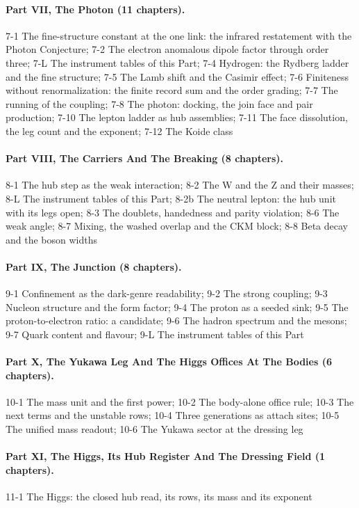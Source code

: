 \paragraph{Part VII, The Photon (11 chapters).} 7-1 The fine-structure constant at the one link: the infrared restatement with the Photon Conjecture; 7-2 The electron anomalous dipole factor through order three; 7-L The instrument tables of this Part; 7-4 Hydrogen: the Rydberg ladder and the fine structure; 7-5 The Lamb shift and the Casimir effect; 7-6 Finiteness without renormalization: the finite record sum and the order grading; 7-7 The running of the coupling; 7-8 The photon: docking, the join face and pair production; 7-10 The lepton ladder as hub assemblies; 7-11 The face dissolution, the leg count and the exponent; 7-12 The Koide class
\paragraph{Part VIII, The Carriers And The Breaking (8 chapters).} 8-1 The hub step as the weak interaction; 8-2 The W and the Z and their masses; 8-L The instrument tables of this Part; 8-2b The neutral lepton: the hub unit with its legs open; 8-3 The doublets, handedness and parity violation; 8-6 The weak angle; 8-7 Mixing, the washed overlap and the CKM block; 8-8 Beta decay and the boson widths
\paragraph{Part IX, The Junction (8 chapters).} 9-1 Confinement as the dark-genre readability; 9-2 The strong coupling; 9-3 Nucleon structure and the form factor; 9-4 The proton as a seeded sink; 9-5 The proton-to-electron ratio: a candidate; 9-6 The hadron spectrum and the mesons; 9-7 Quark content and flavour; 9-L The instrument tables of this Part
\paragraph{Part X, The Yukawa Leg And The Higgs Offices At The Bodies (6 chapters).} 10-1 The mass unit and the first power; 10-2 The body-alone office rule; 10-3 The next terms and the unstable rows; 10-4 Three generations as attach sites; 10-5 The unified mass readout; 10-6 The Yukawa sector at the dressing leg
\paragraph{Part XI, The Higgs, Its Hub Register And The Dressing Field (1 chapters).} 11-1 The Higgs: the closed hub read, its rows, its mass and its exponent
